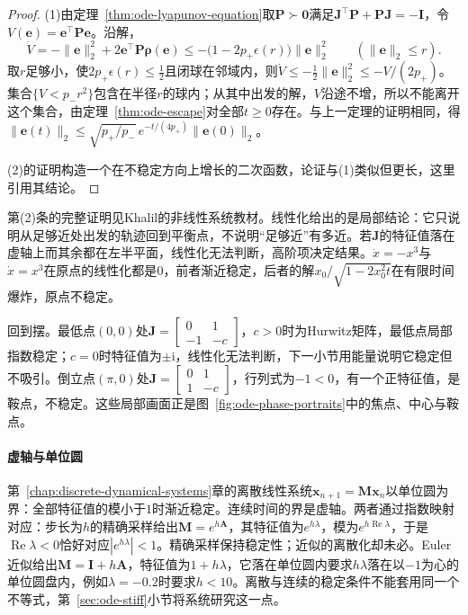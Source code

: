 \begin{proof}
  (1)由定理~\ref{thm:ode-lyapunov-equation}取$\bm P\succ\bm0$满足$\bm J^\top\bm P+\bm P\bm J=-\bm I$，令$V(\bm e)=\bm e^\top\bm P\bm e$。沿解，
  \[
    \dot V=-\|\bm e\|_2^2+2\bm e^\top\bm P\bm\rho(\bm e)\leq-\bigl(1-2p_+\epsilon(r)\bigr)\|\bm e\|_2^2\qquad(\|\bm e\|_2\leq r).
  \]
  取$r$足够小，使$2p_+\epsilon(r)\leq\tfrac12$且闭球在邻域内，则$\dot V\leq-\tfrac12\|\bm e\|_2^2\leq-V/(2p_+)$。集合$\{V<p_-r^2\}$包含在半径$r$的球内；从其中出发的解，$V$沿途不增，所以不能离开这个集合，由定理~\ref{thm:ode-escape}对全部$t\geq0$存在。与上一定理的证明相同，得$\|\bm e(t)\|_2\leq\sqrt{p_+/p_-}\,e^{-t/(4p_+)}\|\bm e(0)\|_2$。

  (2)的证明构造一个在不稳定方向上增长的二次函数，论证与(1)类似但更长，这里引用其结论。
\end{proof}

第(2)条的完整证明见Khalil的非线性系统教材。线性化给出的是局部结论：它只说明从足够近处出发的轨迹回到平衡点，不说明“足够近”有多近。若$\bm J$的特征值落在虚轴上而其余都在左半平面，线性化无法判断，高阶项决定结果。$\dot x=-x^3$与$\dot x=x^3$在原点的线性化都是$0$，前者渐近稳定，后者的解$x_0/\sqrt{1-2x_0^2t}$在有限时间爆炸，原点不稳定。

回到摆。最低点$(0,0)$处$\bm J=\begin{bmatrix}0&1\\-1&-c\end{bmatrix}$，$c>0$时为Hurwitz矩阵，最低点局部指数稳定；$c=0$时特征值为$\pm\mathrm i$，线性化无法判断，下一小节用能量说明它稳定但不吸引。倒立点$(\pi,0)$处$\bm J=\begin{bmatrix}0&1\\1&-c\end{bmatrix}$，行列式为$-1<0$，有一个正特征值，是鞍点，不稳定。这些局部画面正是图~\ref{fig:ode-phase-portraits}中的焦点、中心与鞍点。

\paragraph{虚轴与单位圆}
第~\ref{chap:discrete-dynamical-systems}章的离散线性系统$\bm x_{n+1}=\bm M\bm x_n$以单位圆为界：全部特征值的模小于$1$时渐近稳定。连续时间的界是虚轴。两者通过指数映射对应：步长为$h$的精确采样给出$\bm M=e^{h\bm A}$，其特征值为$e^{h\lambda}$，模为$e^{h\operatorname{Re}\lambda}$，于是$\operatorname{Re}\lambda<0$恰好对应$|e^{h\lambda}|<1$。精确采样保持稳定性；近似的离散化却未必。Euler近似给出$\bm M=\bm I+h\bm A$，特征值为$1+h\lambda$，它落在单位圆内要求$h\lambda$落在以$-1$为心的单位圆盘内，例如$\lambda=-0.2$时要求$h<10$。离散与连续的稳定条件不能套用同一个不等式，第~\ref{sec:ode-stiff}小节将系统研究这一点。

